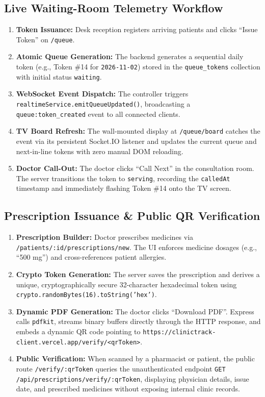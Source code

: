 \documentclass[12pt,a4paper,oneside]{report}
\begin{document}
\subsection{Live Waiting-Room Telemetry Workflow}
\begin{enumerate}
    \item \textbf{Token Issuance:} Desk reception registers arriving patients and clicks ``Issue Token'' on \texttt{/queue}.
    \item \textbf{Atomic Queue Generation:} The backend generates a sequential daily token (e.g., Token \#14 for \texttt{2026-11-02}) stored in the \texttt{queue\_tokens} collection with initial status \texttt{waiting}.
    \item \textbf{WebSocket Event Dispatch:} The controller triggers \texttt{realtimeService.emitQueueUpdated()}, broadcasting a \texttt{queue:token\_created} event to all connected clients.
    \item \textbf{TV Board Refresh:} The wall-mounted display at \texttt{/queue/board} catches the event via its persistent Socket.IO listener and updates the current queue and next-in-line tokens with zero manual DOM reloading.
    \item \textbf{Doctor Call-Out:} The doctor clicks ``Call Next'' in the consultation room. The server transitions the token to \texttt{serving}, recording the \texttt{calledAt} timestamp and immediately flashing Token \#14 onto the TV screen.
\end{enumerate}

\subsection{Prescription Issuance \& Public QR Verification}
\begin{enumerate}
    \item \textbf{Prescription Builder:} Doctor prescribes medicines via \texttt{/patients/:id/prescriptions/new}. The UI enforces medicine dosages (e.g., ``500 mg'') and cross-references patient allergies.
    \item \textbf{Crypto Token Generation:} The server saves the prescription and derives a unique, cryptographically secure 32-character hexadecimal token using \texttt{crypto.randomBytes(16).toString('hex')}.
    \item \textbf{Dynamic PDF Generation:} The doctor clicks ``Download PDF''. Express calls \texttt{pdfkit}, streams binary buffers directly through the HTTP response, and embeds a dynamic QR code pointing to \texttt{https://clinictrack-client.vercel.app/verify/<qrToken>}.
    \item \textbf{Public Verification:} When scanned by a pharmacist or patient, the public route \texttt{/verify/:qrToken} queries the unauthenticated endpoint \texttt{GET /api/prescriptions/verify/:qrToken}, displaying physician details, issue date, and prescribed medicines without exposing internal clinic records.
\end{enumerate}
\end{document}
